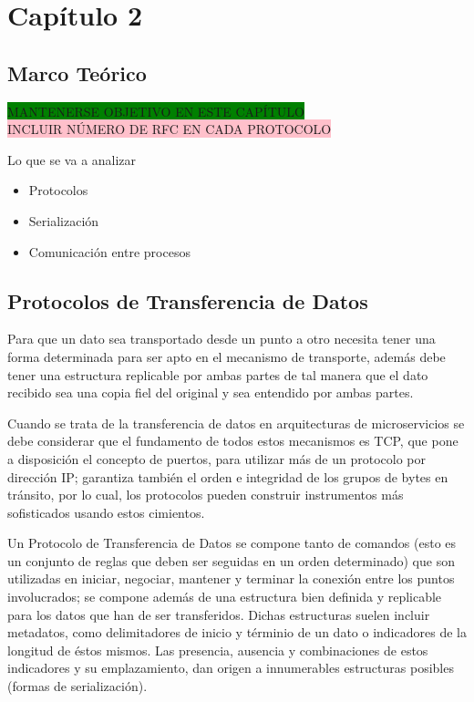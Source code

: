 \chapter{Capítulo 2}

\section{Marco Teórico}

\colorbox{green}{MANTENERSE OBJETIVO EN ESTE CAPÍTULO} \\
\colorbox{pink}{INCLUIR NÚMERO DE RFC EN CADA PROTOCOLO}

Lo que se va a analizar
\begin{itemize}
  \item Protocolos
  \item Serialización
  \item Comunicación entre procesos
\end{itemize}

\section{Protocolos de Transferencia de Datos}

Para que un dato sea transportado desde un punto a otro necesita tener una forma determinada para ser apto en el mecanismo de transporte, además debe tener una estructura replicable por ambas partes de tal manera que el dato recibido sea una copia fiel del original y sea entendido por ambas partes.

Cuando se trata de la transferencia de datos en arquitecturas de microservicios se debe considerar que el fundamento de todos estos mecanismos es TCP, que pone a disposición el concepto de puertos, para utilizar más de un protocolo por dirección IP; garantiza también el orden e integridad de los grupos de bytes en tránsito, por lo cual, los protocolos pueden construir instrumentos más sofisticados usando estos cimientos.

Un Protocolo de Transferencia de Datos se compone tanto de comandos (esto es un conjunto de reglas que deben ser seguidas en un orden determinado) que son utilizadas en iniciar, negociar, mantener y terminar la conexión entre los puntos involucrados; se compone además de una estructura bien definida y replicable para los datos que han de ser transferidos. Dichas estructuras suelen incluir metadatos, como delimitadores de inicio y términio de un dato o indicadores de la longitud de éstos mismos. Las presencia, ausencia y combinaciones de estos indicadores y su emplazamiento, dan origen a innumerables estructuras posibles (formas de serialización).

